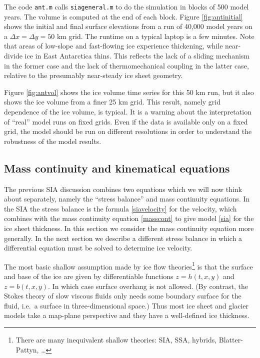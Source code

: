 \documentclass[titlepage,letterpaper,final,12pt]{scrartcl}
\begin{document}
The code \texttt{ant.m} calls \texttt{siageneral.m} to do the simulation in blocks of 500 model years.  The volume is computed at the end of each block.  Figure \ref{fig:antinitial} shows the initial and final surface elevations from a run of 40,000 model years on a $\Delta x = \Delta y = 50$ km grid.  The runtime on a typical laptop is a few minutes.  Note that areas of low-slope and fast-flowing ice experience thickening, while near-divide ice in East Antarctica thins.  This reflects the lack of a sliding mechanism in the former case and the lack of thermomechanical coupling in the latter case, relative to the presumably near-steady ice sheet geometry.

Figure \ref{fig:antvol} shows the ice volume time series for this 50 km run, but it also shows the ice volume from a finer 25 km grid.  This result, namely grid dependence of the ice volume, is typical.  It is a warning about the interpretation of ``real'' model runs on fixed grids.  Even if the data is available only on a fixed grid, the model should be run on different resolutions in order to understand the robustness of the model results.


\subsection{Mass continuity and kinematical equations}

The previous SIA discussion combines two equations which we will now think about separately, namely the ``stress balance'' and mass continuity equations.  In the SIA the stress balance is the formula \eqref{siavelocity} for the velocity, which combines with the mass continuity equation \eqref{masscont} to give model \eqref{sia} for the ice sheet thickness.  In this section we consider the mass continuity equation more generally.  In the next section we describe a different stress balance in which a differential equation must be solved to determine ice velocity.

The most basic shallow assumption made by ice flow theories\footnote{There are many inequivalent shallow theories: SIA, SSA, hybrids, Blatter-Pattyn, \dots} is that the surface and base of the ice are given by differentiable functions $z=h(t,x,y)$ and $z=b(t,x,y)$.  In which case surface overhang is not allowed.  (By contrast, the Stokes theory of slow viscous fluids only needs some boundary surface for the fluid, i.e.~a surface in three-dimensional space.)  Thus most ice sheet and glacier models take a map-plane perspective and they have a well-defined ice thickness.
\end{document}
